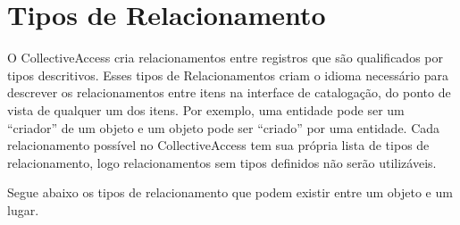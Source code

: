 \section{Tipos de Relacionamento}

O CollectiveAccess cria relacionamentos entre registros que são qualificados por tipos descritivos. Esses tipos de Relacionamentos criam o idioma necessário para descrever os relacionamentos entre itens na interface de catalogação, do ponto de vista de qualquer um dos itens. Por exemplo, uma entidade pode ser um “criador” de um objeto e um objeto pode ser “criado” por uma entidade. Cada relacionamento possível no CollectiveAccess tem sua própria lista de tipos de relacionamento, logo relacionamentos sem tipos definidos não serão utilizáveis.

Segue abaixo os tipos de relacionamento que podem existir entre um objeto e um lugar.


